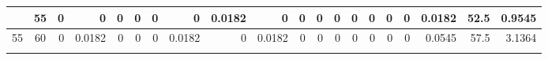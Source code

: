 \begin{table}[ht]
\begin{adjustbox}{width = \textwidth, center}
\begin{tabular}{|cc|r|r|r|r|r|r|r|r|r|r|r|r|r|r|r|rrr|}
        \rowcolor[HTML]{FFFFFF} 
        \cellcolor[HTML]{C8E4BE}\enskip 50 \enskip            & \cellcolor[HTML]{D9EAD3}55          & 0                                              & 0                                              & 0                                              & 0                                              & 0                                              & 0                                              & \cellcolor[HTML]{C7E9D8}0.0182                 & 0                                               & 0                                               & 0                                               & 0                                               & 0                                               & 0                                               & 0                                               & 0                                               & \multicolumn{1}{r|}{\cellcolor[HTML]{D9D2E9}0.0182}                                   & \multicolumn{1}{r|}{\cellcolor[HTML]{D9D2E9}52.5}                       & \cellcolor[HTML]{D9D2E9}0.9545                                                              \\ \hline
        \rowcolor[HTML]{FFFFFF} 
        \cellcolor[HTML]{C8E4BE}55           & \cellcolor[HTML]{D9EAD3}60          & 0                                              & \cellcolor[HTML]{C7E9D8}0.0182                 & 0                                              & 0                                              & 0                                              & \cellcolor[HTML]{C7E9D8}0.0182                 & 0                                              & \cellcolor[HTML]{C7E9D8}0.0182                  & 0                                               & 0                                               & 0                                               & 0                                               & 0                                               & 0                                               & 0                                               & \multicolumn{1}{r|}{\cellcolor[HTML]{D9D2E9}0.0545}                                   & \multicolumn{1}{r|}{\cellcolor[HTML]{D9D2E9}57.5}                       & \cellcolor[HTML]{D9D2E9}3.1364                                                              \\ \hline
        \rowcolor[HTML]{FFFFFF} 

\end{tabular}
\end{adjustbox}
\end{table}
